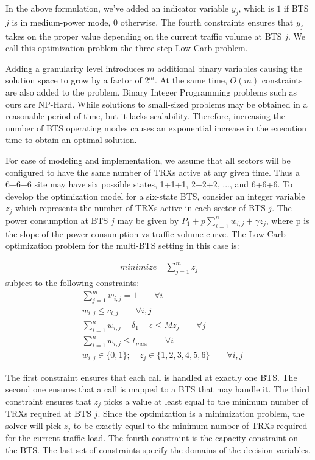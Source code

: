 In the above formulation, we've added an indicator variable $y_j$, which is $1$ if BTS $j$ is in medium-power mode, $0$ otherwise. The fourth constraints ensures that $y_j$ takes on the proper value depending on the current traffic volume at BTS $j$. We call this optimization problem the three-step Low-Carb problem.

Adding a granularity level introduces $m$ additional binary variables causing the solution space to grow by a factor of $2^m$. At the same time, $O(m)$ constraints are also added to the problem. Binary Integer Programming problems such as ours are NP-Hard. While solutions to small-sized problems may be obtained in a reasonable period of time, but it lacks scalability. Therefore, increasing the number of BTS operating modes causes an exponential increase in the execution time to obtain an optimal solution. 

For ease of modeling and implementation, we assume that all sectors will be configured to have the same number of TRXs active at any given time. Thus a 6+6+6 site may have six possible states, 1+1+1, 2+2+2, ..., and 6+6+6. To develop the optimization model for a six-state BTS, consider an integer variable $z_j$ which represents the number of TRXs active in each sector of BTS $j$. The power consumption at BTS $j$ may be given by $P_1 + p \sum_{i=1}^{n} w_{i,j} + \gamma z_j$, where p is the slope of the power consumption vs traffic volume curve. The Low-Carb optimization problem for the multi-BTS setting in this case is:

\begin{align}
\textit{minimize} \quad \sum_{j=1}^{m} z_j
\end{align}
subject to the following constraints:
\begin{align}
& \sum_{j=1}^m w_{i,j} = 1 \qquad \forall i \\
& w_{i,j} \leq c_{i,j} \qquad \forall i, j \\
& \sum_{i=1}^nw_{i,j}-\delta_1 +\epsilon \leq Mz_j \qquad \forall j \\
& \sum_{i=1}^n w_{i,j} \le t_{max} \qquad \forall i \\
& w_{i,j} \in \{0,1\}; \quad z_j \in \{1,2,3,4,5,6\}\qquad \forall i, j%
\end{align}

The first constraint ensures that each call is handled at exactly one BTS. The second one ensures that a call is mapped to a BTS that may handle it. The third constraint ensures that $z_j$ picks a value at least equal to the minimum number of TRXs required at BTS $j$. Since the optimization is a minimization problem, the solver will pick $z_j$ to be exactly equal to the minimum number of TRXs required for the current traffic load. The fourth constraint is the capacity constraint on the BTS. The last set of constraints specify the domains of the decision variables.

